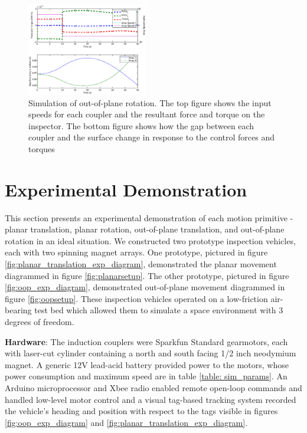 \documentclass[letterpaper, 10 pt, conference]{ieeeconf}  %
\begin{document}
   \begin{figure}[thpb]
      \centering
      \includegraphics[width = 0.47\textwidth]{figures/curve_rotations.eps}
      \caption{Simulation of out-of-plane rotation. The top figure shows the input speeds for each coupler and the resultant force and torque on the inspector. The bottom figure shows how the gap between each coupler and the surface change in response to the control forces and torques}
      \label{fig:oop_rotation_sim}
   \end{figure}

\section{Experimental Demonstration}\label{sec:experiments}
This section presents an experimental demonstration of each motion primitive - planar translation, planar rotation, out-of-plane translation, and out-of-plane rotation in an ideal situation. We constructed two prototype inspection vehicles, each with two spinning magnet arrays. One prototype, pictured in  figure \ref{fig:planar_translation_exp_diagram}, demonstrated the planar movement diagrammed in figure \ref{fig:planarsetup}. The other prototype, pictured in  figure \ref{fig:oop_exp_diagram}, demonstrated out-of-plane movement diagrammed in figure \ref{fig:oopsetup}. These inspection vehicles operated on a low-friction air-bearing test bed which allowed them to simulate a space environment with 3 degrees of freedom. 

\par \textbf{Hardware}: The induction couplers were Sparkfun Standard gearmotors, each with laser-cut cylinder containing a north and south facing 1/2 inch neodymium magnet. A generic 12V lead-acid battery provided power to the motors, whose power consumption and maximum speed are in table \ref{table: sim_params}. An Arduino microprocessor and Xbee radio enabled remote open-loop commands and handled low-level motor control and a visual tag-based tracking system recorded the vehicle's heading and position with respect to the tags visible in figures \ref{fig:oop_exp_diagram} and \ref{fig:planar_translation_exp_diagram}. 
\end{document}
